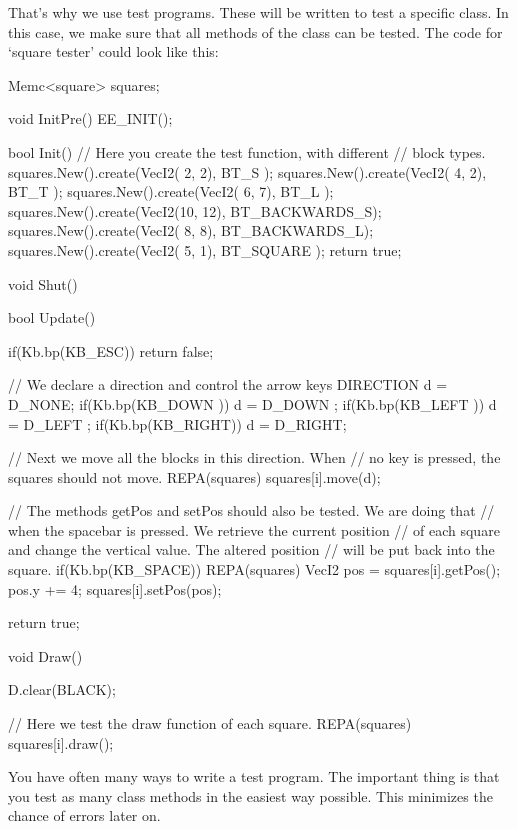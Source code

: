 That's why we use test programs. These will be written to test a specific class. In this case, we make sure that all methods of the class  can be tested. The code for `square tester' could look like this:

\begin{code}

Memc<square> squares;

void InitPre()
{
   EE_INIT();
}                
       
bool Init()
{   
	 // Here you create the test function, with different
	 // block types.
   squares.New().create(VecI2( 2,  2), BT_S          );
   squares.New().create(VecI2( 4,  2), BT_T          );
   squares.New().create(VecI2( 6,  7), BT_L          );
   squares.New().create(VecI2(10, 12), BT_BACKWARDS_S);
   squares.New().create(VecI2( 8,  8), BT_BACKWARDS_L);
   squares.New().create(VecI2( 5,  1), BT_SQUARE     );
	 return true;
}

void Shut() {}

bool Update()
{
   if(Kb.bp(KB_ESC)) return false;
   
	 // We declare a direction and control the arrow keys
   DIRECTION d = D_NONE;
   if(Kb.bp(KB_DOWN )) d = D_DOWN ;
   if(Kb.bp(KB_LEFT )) d = D_LEFT ;
   if(Kb.bp(KB_RIGHT)) d = D_RIGHT;
   
	 // Next we move all the blocks in this direction. When
	 // no key is pressed, the squares should not move.
   REPA(squares)
   {
      squares[i].move(d);
   }
   
	 // The methods getPos and setPos should also be tested. We are doing that
	 // when the spacebar is pressed. We retrieve the current position
	 // of each square and change the vertical value. The altered position
	 // will be put back into the square.
   if(Kb.bp(KB_SPACE))
   {
      REPA(squares)
      {
         VecI2 pos = squares[i].getPos();
         pos.y += 4;
         squares[i].setPos(pos);
      }
   }
   
   return true;
}

void Draw()
{
   D.clear(BLACK);
	
	 // Here we test the draw function of each square.
   REPA(squares)
   {
      squares[i].draw();
   }
}

\end{code}

\begin{note}
You have often many ways to write a test program. The important thing is that you test as many class methods in the easiest way possible. This minimizes the chance of errors later on.
\end{note}

